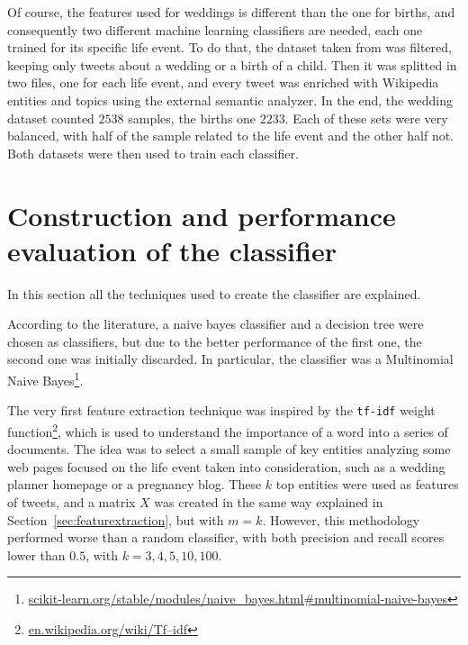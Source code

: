 Of course, the features used for weddings is different than the one for births, and consequently two different machine learning classifiers are needed, each one trained for its specific life event. To do that, the dataset taken from \cite{dickinson2015identifying} was filtered, keeping only tweets about a wedding or a birth of a child. Then it was splitted in two files, one for each life event, and every tweet was enriched with Wikipedia entities and topics using the external semantic analyzer. In the end, the wedding dataset counted $2538$ samples, the births one $2233$. Each of these sets were very balanced, with half of the sample related to the life event and the other half not. Both datasets were then used to train each classifier.

\section{Construction and performance evaluation of the classifier}
In this section all the techniques used to create the classifier are explained.

 According to the literature, a naive bayes classifier and a decision tree were chosen as classifiers, but due to the better performance of the first one, the second one was initially discarded. In particular, the classifier was a Multinomial Naive Bayes\footnote{\url{scikit-learn.org/stable/modules/naive_bayes.html#multinomial-naive-bayes}}.

The very first feature extraction technique was inspired by the \texttt{tf-idf} weight function\footnote{\url{en.wikipedia.org/wiki/Tf–idf}}, which is used to understand the importance of a word into a series of documents. The idea was to select a small sample of key entities analyzing some web pages focused on the life event taken into consideration, such as a wedding planner homepage or a pregnancy blog. These $k$ top entities were used as features of tweets, and a matrix $X$ was created in the same way explained in Section~\ref{sec:featurextraction}, but with $m = k$. However, this methodology performed worse than a random classifier, with both precision and recall scores lower than $0.5$, with $k = 3, 4, 5, 10, 100$.

